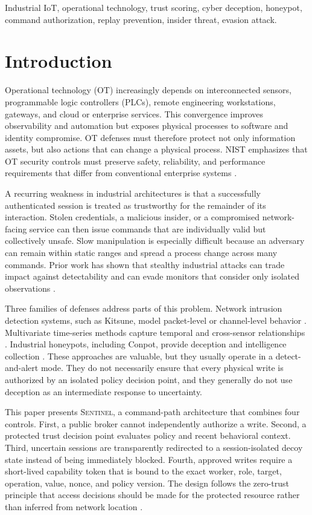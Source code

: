 \documentclass[journal]{IEEEtran}
\newcommand{\sentinel}{\textsc{Sentinel}}
\begin{document}
\begin{IEEEkeywords}
Industrial IoT, operational technology, trust scoring, cyber deception, honeypot, command authorization, replay prevention, insider threat, evasion attack.
\end{IEEEkeywords}

\section{Introduction}
Operational technology (OT) increasingly depends on interconnected sensors, programmable logic controllers (PLCs), remote engineering workstations, gateways, and cloud or enterprise services. This convergence improves observability and automation but exposes physical processes to software and identity compromise. OT defenses must therefore protect not only information assets, but also actions that can change a physical process. NIST emphasizes that OT security controls must preserve safety, reliability, and performance requirements that differ from conventional enterprise systems \cite{nist82}.

A recurring weakness in industrial architectures is that a successfully authenticated session is treated as trustworthy for the remainder of its interaction. Stolen credentials, a malicious insider, or a compromised network-facing service can then issue commands that are individually valid but collectively unsafe. Slow manipulation is especially difficult because an adversary can remain within static ranges and spread a process change across many commands. Prior work has shown that stealthy industrial attacks can trade impact against detectability and can evade monitors that consider only isolated observations \cite{urbina2016}.

Three families of defenses address parts of this problem. Network intrusion detection systems, such as Kitsune, model packet-level or channel-level behavior \cite{kitsune}. Multivariate time-series methods capture temporal and cross-sensor relationships \cite{gdn,usad,tranad}. Industrial honeypots, including Conpot, provide deception and intelligence collection \cite{conpot,ics_honeypot_survey}. These approaches are valuable, but they usually operate in a detect-and-alert mode. They do not necessarily ensure that every physical write is authorized by an isolated policy decision point, and they generally do not use deception as an intermediate response to uncertainty.

This paper presents \sentinel, a command-path architecture that combines four controls. First, a public broker cannot independently authorize a write. Second, a protected trust decision point evaluates policy and recent behavioral context. Third, uncertain sessions are transparently redirected to a session-isolated decoy state instead of being immediately blocked. Fourth, approved writes require a short-lived capability token that is bound to the exact worker, role, target, operation, value, nonce, and policy version. The design follows the zero-trust principle that access decisions should be made for the protected resource rather than inferred from network location \cite{nist207}.
\end{document}
